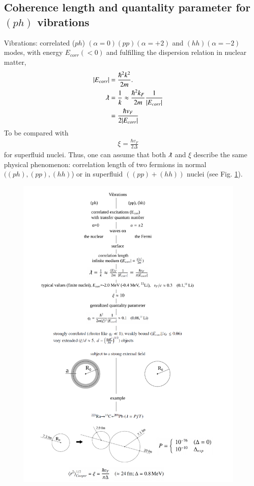 \begin{subappendices}
 \subsection{Coherence length and quantality parameter for $(ph)$ vibrations}
 Vibrations: correlated ($ph$) $(\alpha=0) (pp) (\alpha=+2)$ and $(hh)(\alpha=-2)$ modes, with energy $E_{corr}(<0)$ and fulfilling the dispersion relation in nuclear matter,
 \begin{align}
 \nonumber|E_{corr}|&=\frac{\hbar^2k^2}{2m}.\\
 \nonumber\lambdabar&=\frac{1}{k}\approx \frac{\hbar^2k_F}{2m}\frac{1}{|E_{corr}|}\\
 &=\frac{\hbar v_F}{2|E_{corr}|}
 \end{align}  
 To be compared with
 \begin{align}
 \xi=\frac{\hbar v_F}{2\Delta}
 \end{align} 
 for superfluid nuclei. Thus, one can assume that both $\lambdabar$ and $\xi$ describe the same physical phenomenon: correlation length of two fermions in normal $((ph),(pp),(hh)$) or in superfluid $((pp)+(hh))$ nuclei (see Fig. \ref{fig3B3x}).
       \begin{figure}
       	\centerline{\includegraphics*[width=17cm,angle=0	]{nutshell/figs/fig3B3x}}
       	\caption{}\label{fig3B3x}
       \end{figure}

\end{subappendices}
